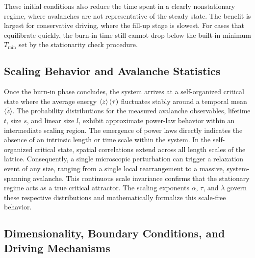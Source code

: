 These initial conditions also reduce the time spent in a clearly nonstationary regime, where avalanches are not representative of the steady state. The benefit is largest for conservative driving, where the fill-up stage is slowest. For cases that equilibrate quickly, the burn-in time still cannot drop below the built-in minimum $T_{\min}$ set by the stationarity check procedure.

\subsection{Scaling Behavior and Avalanche Statistics}

Once the burn-in phase concludes, the system arrives at a self-organized critical state where the average energy $\expval{z}(\tau)$ fluctuates stably around a temporal mean $\overline{\langle z \rangle}$. The probability distributions for the measured avalanche observables, lifetime $t$, size $s$, and linear size $l$, exhibit approximate power-law behavior within an intermediate scaling region. The emergence of power laws directly indicates the absence of an intrinsic length or time scale within the system. In the self-organized critical state, spatial correlations extend across all length scales of the lattice. Consequently, a single microscopic perturbation can trigger a relaxation event of any size, ranging from a single local rearrangement to a massive, system-spanning avalanche. This continuous scale invariance confirms that the stationary regime acts as a true critical attractor. The scaling exponents $\alpha$, $\tau$, and $\lambda$ govern these respective distributions and mathematically formalize this scale-free behavior.

\subsection{Dimensionality, Boundary Conditions, and Driving Mechanisms}

